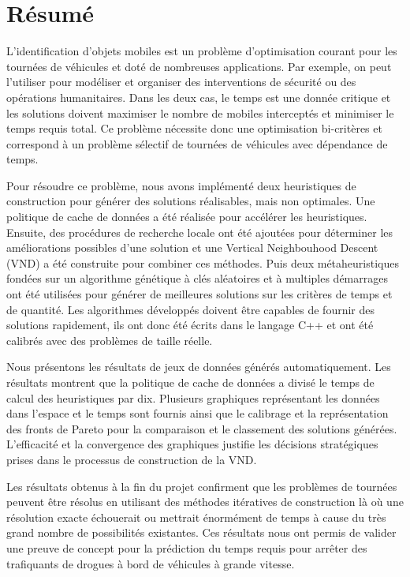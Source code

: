 \section*{Résumé}

L'identification d'objets mobiles est un problème d'optimisation courant pour les tournées de véhicules et doté de nombreuses applications. Par exemple, on peut l'utiliser pour modéliser et organiser des interventions de sécurité ou des opérations humanitaires. Dans les deux cas, le temps est une donnée critique et les solutions doivent maximiser le nombre de mobiles interceptés et minimiser le temps requis total. Ce problème nécessite donc une optimisation bi-critères et correspond à un problème sélectif de tournées de véhicules avec dépendance de temps. 

Pour résoudre ce problème, nous avons implémenté deux heuristiques de construction pour générer des solutions réalisables, mais non optimales. Une politique de cache de données a été réalisée pour accélérer les heuristiques. Ensuite, des procédures de recherche locale ont été ajoutées pour déterminer les améliorations possibles d'une solution et une Vertical Neighbouhood Descent (VND) a été construite pour combiner ces méthodes. Puis deux métaheuristiques fondées sur un algorithme génétique à clés aléatoires et à multiples démarrages ont été utilisées pour générer de meilleures solutions sur les critères de temps et de quantité. Les algorithmes développés doivent être capables de fournir des solutions rapidement, ils ont donc été écrits dans le langage C++ et ont été calibrés avec des problèmes de taille réelle. 

Nous présentons les résultats de jeux de données générés automatiquement. Les résultats montrent que la politique de cache de données a divisé le temps de calcul des heuristiques par dix. Plusieurs graphiques représentant les données dans l'espace et le temps sont fournis ainsi que le calibrage et la représentation des fronts de Pareto pour la comparaison et le classement des solutions générées. L'efficacité et la convergence des graphiques justifie les décisions stratégiques prises dans le processus de construction de la VND. 

Les résultats obtenus à la fin du projet confirment que les problèmes de tournées peuvent être résolus en utilisant des méthodes itératives de construction là où une résolution exacte échouerait ou mettrait énormément de temps à cause du très grand nombre de possibilités existantes. Ces résultats nous ont permis de valider une preuve de concept pour la prédiction du temps requis pour arrêter des trafiquants de drogues à bord de véhicules à grande vitesse.

